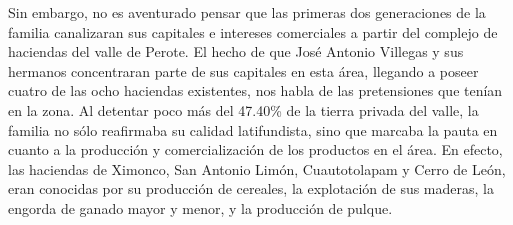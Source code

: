 \documentclass[14pt,twoside,final]{extbook} %
\begin{document}
Sin embargo, no es aventurado pensar que las primeras dos generaciones de la familia canalizaran sus capitales e intereses comerciales a partir del complejo de haciendas del valle de Perote. El hecho de que José Antonio Villegas y sus hermanos concentraran parte de sus capitales en esta área, llegando a poseer cuatro de las ocho haciendas existentes, nos habla de las pretensiones que tenían en la zona. Al detentar poco más del 47.40\% de la tierra privada del valle, la familia no sólo reafirmaba su calidad latifundista, sino que marcaba la pauta en cuanto a la producción y comercialización de los productos en el área. En efecto, las haciendas de Ximonco, San Antonio Limón, Cuautotolapam y Cerro de León, eran conocidas por su producción de cereales, la explotación de sus maderas, la engorda de ganado mayor y menor, y la producción de pulque.
\end{document}
